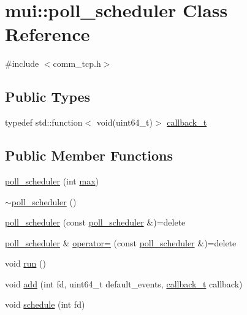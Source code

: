 \hypertarget{classmui_1_1poll__scheduler}{}\section{mui\+:\+:poll\+\_\+scheduler Class Reference}
\label{classmui_1_1poll__scheduler}


{\ttfamily \#include $<$comm\+\_\+tcp.\+h$>$}

\subsection*{Public Types}
\begin{DoxyCompactItemize}
\item 
typedef std\+::function$<$ void(uint64\+\_\+t)$>$ \hyperlink{classmui_1_1poll__scheduler_af5bd0cf1190776e89355d42aebb0a45f}{callback\+\_\+t}
\end{DoxyCompactItemize}
\subsection*{Public Member Functions}
\begin{DoxyCompactItemize}
\item 
\hyperlink{classmui_1_1poll__scheduler_a8c6f972559ee20b171d613d056bd0373}{poll\+\_\+scheduler} (int \hyperlink{namespacemui_aca8bb75431ac5c48173731e02a5c6246}{max})
\item 
\hyperlink{classmui_1_1poll__scheduler_a2943a4f66f9b5b1d5ebde2f59d342058}{$\sim$poll\+\_\+scheduler} ()
\item 
\hyperlink{classmui_1_1poll__scheduler_a040e9f10304ca72b863f134dbc5e0b28}{poll\+\_\+scheduler} (const \hyperlink{classmui_1_1poll__scheduler}{poll\+\_\+scheduler} \&)=delete
\item 
\hyperlink{classmui_1_1poll__scheduler}{poll\+\_\+scheduler} \& \hyperlink{classmui_1_1poll__scheduler_a794c59cf98a5c087bf63e244dbf5e81b}{operator=} (const \hyperlink{classmui_1_1poll__scheduler}{poll\+\_\+scheduler} \&)=delete
\item 
void \hyperlink{classmui_1_1poll__scheduler_a53e79c4a215767ccd5bead93395e1fae}{run} ()
\item 
void \hyperlink{classmui_1_1poll__scheduler_afd46a617c8dc86e098570b20fc924101}{add} (int fd, uint64\+\_\+t default\+\_\+events, \hyperlink{classmui_1_1poll__scheduler_af5bd0cf1190776e89355d42aebb0a45f}{callback\+\_\+t} callback)
\item 
void \hyperlink{classmui_1_1poll__scheduler_aa8d1cf562302bcf38b3183950d256e4e}{schedule} (int fd)
\end{DoxyCompactItemize}
